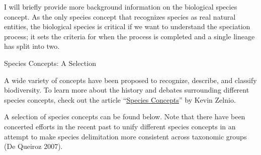 \documentclass[
]{book}
\begin{document}
I will briefly provide more background information on the biological species concept. As the only species concept that recognizes species as real natural entities, the biological species is critical if we want to understand the speciation process; it sets the criteria for when the process is completed and a single lineage has split into two.

Species Concepts: A Selection

A wide variety of concepts have been proposed to recognize, describe, and classify biodiversity. To learn more about the history and debates surrounding different species concepts, check out the article ``\href{https://blogs.scientificamerican.com/evo-eco-lab/species-concepts/}{Species Concepts}'' by Kevin Zelnio.

A selection of species concepts can be found below. Note that there have been concerted efforts in the recent past to unify different species concepts in an attempt to make species delimitation more consistent across taxonomic groups (De Queiroz 2007).
\end{document}
